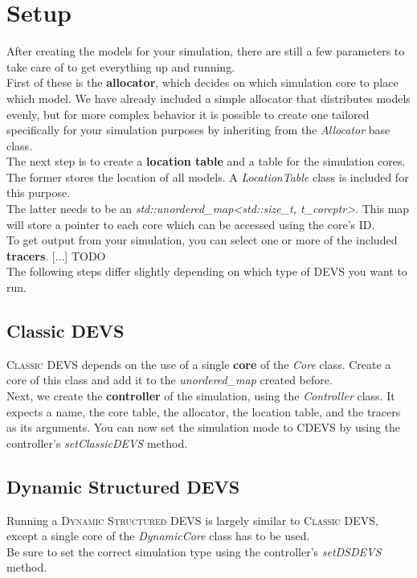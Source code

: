 \section{Setup}

After creating the models for your simulation, there are still a few parameters to take care of to get everything up and running.\\

First of these is the \textbf{allocator}, which decides on which simulation core to place which model. We have already included a simple allocator that distributes models evenly, but for more complex behavior it is possible to create one tailored specifically for your simulation purposes by inheriting from the \textsl{Allocator} base class.\\

The next step is to create a \textbf{location table} and a table for the simulation cores. The former stores the location of all models. A \textsl{LocationTable} class is included for this purpose.\\
The latter needs to be an \textsl{std::unordered\_map{\textless}std::size\_t, t\_coreptr{\textgreater}}. This map will store a pointer to each core which can be accessed using the core's ID.\\

To get output from your simulation, you can select one or more of the included \textbf{tracers}. [...] TODO\\

The following steps differ slightly depending on which type of DEVS you want to run.

\subsection{Classic DEVS}
\textsc{Classic DEVS} depends on the use of a single \textbf{core} of the \textsl{Core} class. Create a core of this class and add it to the \textsl{unordered\_map} created before.\\

Next, we create the \textbf{controller} of the simulation, using the \textsl{Controller} class. It expects a name, the core table, the allocator, the location table, and the tracers as its arguments. You can now set the simulation mode to CDEVS by using the controller's \textsl{setClassicDEVS} method.

\subsection{Dynamic Structured DEVS}
Running a \textsc{Dynamic Structured DEVS} is largely similar to \textsc{Classic DEVS}, except a single core of the \textsl{DynamicCore} class has to be used.\\
Be sure to set the correct simulation type using the controller's \textsl{setDSDEVS} method.

